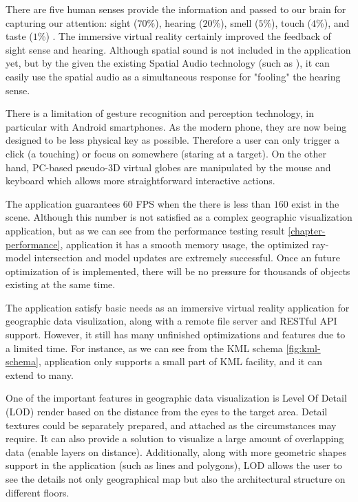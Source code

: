 There are five human senses provide the information and passed to our brain for capturing our attention: sight ($70$\%), hearing ($20$\%), smell ($5$\%), touch ($4$\%), and taste ($1$\%) \cite{mazuryk.vr.1996}. The immersive virtual reality certainly improved the feedback of sight sense and hearing. Although spatial sound is not included in the application yet, but by the given the existing Spatial Audio technology (such as \cite{google.spatial-audio.2016}), it can easily use the spatial audio as a simultaneous response for "fooling" the hearing sense.

There is a limitation of gesture recognition and perception technology, in particular with Android smartphones. As the modern phone, they are now being designed to be less physical key as possible. Therefore a user can only trigger a click (a touching) or focus on somewhere (staring at a target). On the other hand, PC-based pseudo-3D virtual globes are manipulated by the mouse and keyboard which allows more straightforward interactive actions.

The application guarantees $60$ FPS when the there is less than $160$  exist in the scene. Although this number is not satisfied as a complex geographic visualization application, but as we can see from the performance testing result \ref{chapter-performance}, application it has a smooth memory usage, the optimized ray-model intersection and model updates are extremely successful. Once an future optimization of  is implemented, there will be no pressure for thousands of objects existing at the same time.

The application satisfy basic needs as an immersive virtual reality application for geographic data visulization, along with a remote file server and RESTful API support. However, it still has many unfinished optimizations and features due to a limited time. For instance, as we can see from the KML schema \ref{fig:kml-schema}, application only supports a small part of KML facility, and it can extend to many.

One of the important features in geographic data visualization is Level Of Detail (LOD) render based on the distance from the eyes to the target area. Detail textures could be separately prepared, and attached as the circumstances may require. It can also provide a solution to visualize a large amount of overlapping data (enable layers on distance). Additionally, along with more geometric shapes support in the application (such as lines and polygons), LOD allows the user to see the details not only geographical map but also the architectural structure on different floors.

